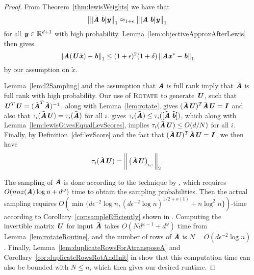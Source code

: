\lewisAndRotate*
\begin{proof}
	From Theorem~\ref{thm:lewisWeights} we have that
	\[ \big\|[\tilde{\AA}\;\tilde{\bb}]\yy\big\|_1 \approx_{1+\epsilon}\big\|[\AA\;\bb]\yy\big\|_1\]
	for all $\yy \in \R^{d+1}$ with high probability. Lemma~\ref{lem:objectiveApproxAfterLewis} then gives
	\[
	\norm{\AA(\UU\tilde{\xx}) - \bb}_1 \leq (1 + \epsilon)^2(1 + \delta)\norm{\AA \xx^* - \bb }_1 \]
	by our assumption on $\tilde{x}$.
	
	Lemma~\ref{lem:l2Sampling} and the assumption that $\AA$ is full rank imply that $\tilde{\AA}$ is full rank with high probability.
	Our use of $\textsc{Rotate}$ to generate $\UU$, such that $\UU^T\UU = (\tilde{\AA}^T\tilde{\AA})^{-1}$, along with Lemma~\ref{lem:rotate}, gives $(\tilde{\AA}\UU)^T\tilde{\AA}\UU = \II$ and also that $\tau_i(\tilde{\AA}\UU) = \tau_i(\tilde{\AA})$ for all $i$.
	 gives $\tau_i(\tilde{\AA}) \leq \tau_i([\tilde{\AA}\;\tilde{\bb}])$, which along with Lemma~\ref{lem:lewisGivesEqualLevScores}, implies $\tau_i(\tilde{\AA}\UU) \leq O(d/N)$ for all $i$.
	Finally, by Definition~\ref{def:levScore} and the fact that $(\tilde{\AA}\UU)^T\tilde{\AA}\UU = \II$, we then have 
	\[\tau_i(\tilde{\AA}\UU) = \bigg\|\left(\tilde{\AA}\UU\right)_{i,:}\bigg\|_2.
	\]
	
	The sampling of $\AA$ is done according to the technique by \cite{cohenpeng}, which requires $O(nnz(\AA)\log{n} + d^{\omega})$ time to obtain the sampling probabilities. Then the actual sampling requires $O(\min\{d\epsilon^{-2}\log{n}, (d\epsilon^{-2}\log{n})^{1/2 + o(1)} + n\log^2{n}\})$-time according to Corollary~\ref{cor:sampleEfficiently} shown in . Computing the invertible matrix $\UU$ for input $\tilde{\AA}$ takes $O(Nd^{\omega-1} + d^{\omega})$ time from Lemma~\ref{lem:rotateRoutine}, and the number of rows of $\tilde{\AA}$ is $N = O(d\epsilon^{-2}\log{n})$.
	Finally, Lemma~\ref{lem:duplicateRowsForAtransposeA} and Corollary~\ref{cor:duplicateRowsRotAndInit} in  show that this computation time can also be bounded with $N \leq n$, which then gives our desired runtime.
\end{proof}

